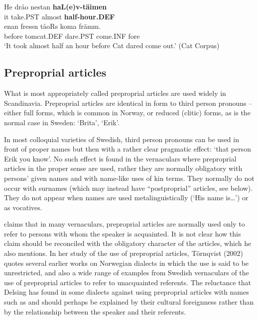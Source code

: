  \ea\label{}
\gll He  dråo  nestan  \textbf{haL(e)v-täimen}\\


it  take.PST  almost  \textbf{half-hour.DEF}\\

 \ea\label{}
\gll enan  fressn  tåoRs  koma  främm.\\


before  tomcat.DEF  dare.PST  come.INF  fore\\

\glt ‘It took almost half an hour before Cat dared come out.’ (Cat Corpus)

\z

\subsection{\rmfamily Preproprial articles}
\label{bkm:Ref224379496}
What is most appropriately called preproprial articles are used widely in Scandinavia. Preproprial articles are identical in form to third person pronouns – either full forms, which is common in Norway, or reduced (clitic) forms, as is the normal case in Sweden:  ‘Brita’, ‘Erik’. 


In most colloquial varieties of Swedish, third person pronouns can be used in front of proper names but then with a rather clear pragmatic effect:  ‘that person Erik you know’. No such effect is found in the vernaculars where preproprial articles in the proper sense are used, rather they are normally obligatory with persons’ given names and with name-like uses of kin terms. They normally do not occur with surnames (which may instead have “postproprial” articles, see below). They do not appear when names are used metalinguistically (‘His name is…’) or as vocatives. 


\citet[21]{Delsing2003a} claims that in many vernaculars, preproprial articles are normally used only to refer to persons with whom the speaker is acquainted. It is not clear how this claim should be reconciled with the obligatory character of the articles, which he also mentions. In her study of the use of preproprial articles, Törnqvist (2002) quotes several earlier works on Norwegian dialects in which the use is said to be unrestricted, and also a wide range of examples from Swedish vernaculars of the use of preproprial articles to refer to unacquainted referents. The reluctance that Delsing has found in some dialects against using preproprial articles with names such as  and  should perhaps be explained by their cultural foreignness rather than by the relationship between the speaker and their referents. 

